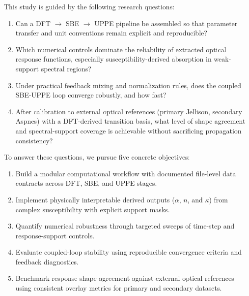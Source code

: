 \documentclass[aps,pra,twocolumn,reprint,superscriptaddress,nofootinbib]{revtex4-2}
\begin{document}
This study is guided by the following research questions:
\begin{enumerate}
\item Can a DFT $\rightarrow$ SBE $\rightarrow$ UPPE pipeline be assembled so
that parameter transfer and unit conventions remain explicit and reproducible?
\item Which numerical controls dominate the reliability of extracted optical
response functions, especially susceptibility-derived absorption in weak-support
spectral regions?
\item Under practical feedback mixing and normalization rules, does the coupled
SBE-UPPE loop converge robustly, and how fast?
\item After calibration to external optical references (primary Jellison, secondary
Aspnes) with a DFT-derived transition basis, what level of
shape agreement and spectral-support coverage is achievable without sacrificing
propagation consistency?
\end{enumerate}

To answer these questions, we pursue five concrete objectives:
\begin{enumerate}
\item Build a modular computational workflow with documented file-level data
contracts across DFT, SBE, and UPPE stages.
\item Implement physically interpretable derived outputs ($\alpha$, $n$, and
$\kappa$) from complex susceptibility with explicit support masks.
\item Quantify numerical robustness through targeted sweeps of time-step and
response-support controls.
\item Evaluate coupled-loop stability using reproducible convergence criteria and
feedback diagnostics.
\item Benchmark response-shape agreement against external optical references
using consistent overlay metrics for primary and secondary datasets.
\end{enumerate}
\end{document}
